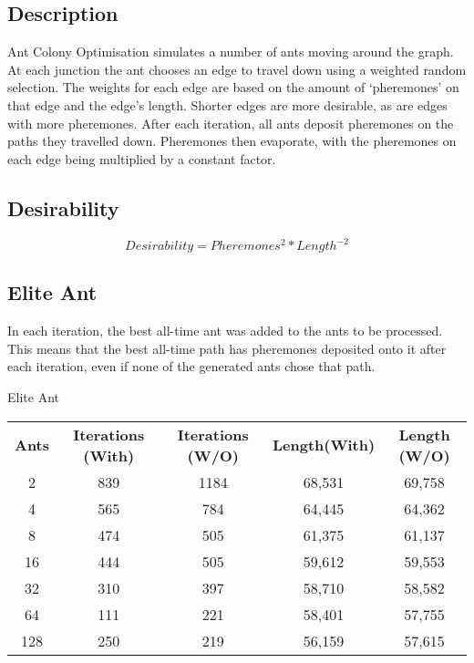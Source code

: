 \documentclass[a4paper, 11pt,table]{article}
\begin{document}
	\subsection{Description}
	Ant Colony Optimisation simulates a number of ants moving around the graph. At each junction the ant chooses an edge to travel down using a weighted random selection. The weights for each edge are based on the amount of `pheremones' on that edge and the edge's length. Shorter edges are more desirable, as are edges with more pheremones. After each iteration, all ants deposit pheremones on the paths they travelled down. Pheremones then evaporate, with the pheremones on each edge being multiplied by a constant factor.
	
	\subsection{Desirability}
	\begin{equation}
		Desirability = Pheremones^{2}*Length^{-2}
	\end{equation}
	
	\subsection{Elite Ant}
	In each iteration, the best all-time ant was added to the ants to be processed. This means that the best all-time path has pheremones deposited onto it after each iteration, even if none of the generated ants chose that path.
	
	\begin{center}
		Elite Ant
		
		\begin{tabu}{|c c c c c|}
			\textbf{Ants} & \textbf{Iterations (With)} & \textbf{Iterations (W/O)} & \textbf{Length(With)} & \textbf{Length (W/O)} \\
			2             & 839                        & 1184                      & 68,531                & 69,758                \\
			4             & 565                        & 784                       & 64,445                & 64,362                \\
			8             & 474                        & 505                       & 61,375                & 61,137                \\
			16            & 444                        & 505                       & 59,612                & 59,553                \\
			32            & 310                        & 397                       & 58,710                & 58,582                \\
			64            & 111                        & 221                       & 58,401                & 57,755                \\
			128           & 250                        & 219                       & 56,159                & 57,615                \\
		\end{tabu}
	\end{center}
	
\end{document}
